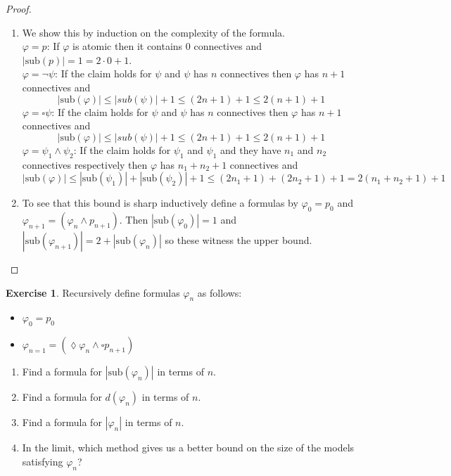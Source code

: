 \documentclass{article}
\newcommand{\vp}{\varphi}
\newcommand{\sub}{\text{sub}}
\theoremstyle{definition}
\newtheorem{exercise}{Exercise}
\begin{document}
\begin{proof} \mbox{} 
    \begin{enumerate}[label = (\alph*)]
        \item We show this by induction on the complexity of the formula. \\ 
        $\vp = p$: If $\vp$ is atomic then it contains 0 connectives and $|\sub(p)|=1=2\cdot 0 + 1$. \\ 
        $\vp = \neg \psi$: If the claim holds for $\psi$ and $\psi$ has $n$ connectives then $\vp$ has $n+1$ connectives and 
        \[ |\sub(\vp)| \le |sub(\psi)| + 1 \le (2n+1) + 1 \le 2(n+1) +1 \] 
        $\vp = \square \psi$: If the claim holds for $\psi$ and $\psi$ has $n$ connectives then $\vp$ has $n+1$ connectives and 
        \[ |\sub(\vp)| \le |sub(\psi)| + 1 \le (2n+1) + 1 \le 2(n+1) +1 \] 
        $\vp = \psi_1 \wedge \psi_2$: If the claim holds for $\psi_1$ and $\psi_1$ and they have $n_1$ and $n_2$ connectives respectively then $\vp$ has $n_1 + n_2 + 1$ connectives and 
        \[ |\sub(\vp)| \le |\sub(\psi_1)| + |\sub(\psi_2)| + 1 \le (2n_1 + 1) + (2n_2 +1) + 1 = 2(n_1 + n_2 + 1) + 1 \] 
        \item To see that this bound is sharp inductively define a formulas by $\vp_0 = p_0$ and $\vp_{n+1} = (\vp_n \wedge p_{n+1})$. Then $|\sub(\vp_0)|=1$ and $|\sub(\vp_{n+1})| = 2 + |\sub(\vp_n)|$ so these witness the upper bound. 
    \end{enumerate}
\end{proof}

\begin{exercise}
    Recursively define formulas $\vp_n$ as follows: 
    \begin{itemize}
        \item $\vp_0 = p_0$
        \item $\vp_{n=1} = (\lozenge \vp_n \wedge \square p_{n+1})$ 
    \end{itemize}
    \begin{enumerate}[label = (\alph*)]
        \item Find a formula for $|\sub(\vp_n)|$ in terms of $n$. 
        \item Find a formula for $d(\vp_n)$ in terms of $n$. 
        \item Find a formula for $|\vp_n|$ in terms of $n$. 
        \item In the limit, which method gives us a better bound on the size of the models satisfying $\vp_n$? 
    \end{enumerate}
\end{exercise}
\end{document}
